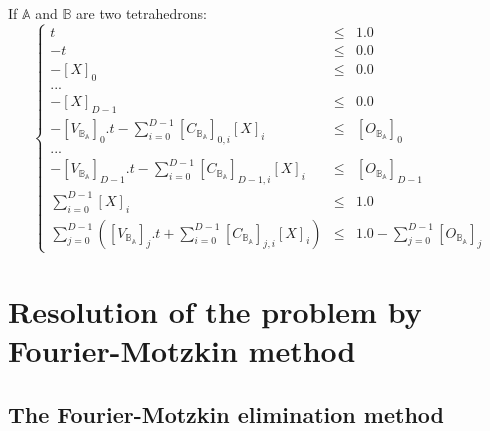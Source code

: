 \documentclass[12pt, a4paper]{article}
\begin{document}
If $\mathbb{A}$ and $\mathbb{B}$ are two tetrahedrons:
\begin{equation}
\left\lbrace
\begin{array}{rcl}
t&\le&1.0\\
-t&\le&0.0\\
-\left[X\right]_0&\le&0.0\\
...\\
-\left[X\right]_{D-1}&\le&0.0\\
-\left[V_{\mathbb{B}_\mathbb{A}}\right]_0.t-\sum_{i=0}^{D-1}\left[C_{\mathbb{B}_\mathbb{A}}\right]_{0,i}\left[X\right]_i&\le&\left[O_{\mathbb{B}_\mathbb{A}}\right]_{0}\\
...\\
-\left[V_{\mathbb{B}_\mathbb{A}}\right]_{D-1}.t-\sum_{i=0}^{D-1}\left[C_{\mathbb{B}_\mathbb{A}}\right]_{D-1,i}\left[X\right]_i&\le&\left[O_{\mathbb{B}_\mathbb{A}}\right]_{D-1}\\
\sum_{i=0}^{D-1}\left[X\right]_i&\le&1.0\\
\sum_{j=0}^{D-1}\left(\left[V_{\mathbb{B}_\mathbb{A}}\right]_j.t+\sum_{i=0}^{D-1}\left[C_{\mathbb{B}_\mathbb{A}}\right]_{j,i}\left[X\right]_i\right)&\le&1.0-\sum_{j=0}^{D-1}\left[O_{\mathbb{B}_\mathbb{A}}\right]_{j}
\end{array}
\right.
\end{equation}

\section{Resolution of the problem by Fourier-Motzkin method}

\subsection{The Fourier-Motzkin elimination method}
\end{document}
